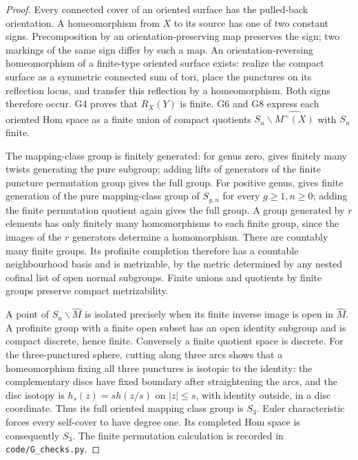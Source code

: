 \begin{proof}
Every connected cover of an oriented surface has the pulled-back
orientation. A homeomorphism from $X$ to its source has one of two
constant signs. Precomposition by an orientation-preserving map
preserves the sign; two markings of the same sign differ by such a
map. An orientation-reversing homeomorphism of a finite-type oriented
surface exists: realize the compact surface as a symmetric connected
sum of tori, place the punctures on its reflection locus, and transfer
this reflection by a homeomorphism. Both signs therefore occur.
G4 proves that $R_X(Y)$ is finite. G6 and G8 express each oriented
Hom space as a finite union of compact quotients
$S_u\backslash\widehat{M^+(X)}$ with $S_u$ finite.

The mapping-class group is finitely generated: for genus zero,
\cite[Theorem 4.9]{G_FarbMargalit} gives finitely many twists generating
the pure subgroup; adding lifts of generators of the finite puncture
permutation group gives the full group. For positive genus,
\cite[Theorem 4.11]{G_FarbMargalit} gives finite generation of the pure
mapping-class group of $S_{g,n}$ for every $g\geq1,n\geq0$; adding the
finite permutation quotient again gives the full group. A group generated by $r$
elements has only finitely many homomorphisms to each finite group,
since the images of the $r$ generators determine a homomorphism.
There are countably many finite groups. Its profinite completion
therefore has a countable neighbourhood basis and is metrizable,
by the metric determined by any nested cofinal list of open normal
subgroups. Finite unions and quotients by finite groups preserve
compact metrizability.

A point of $S_u\backslash\widehat M$ is isolated precisely when
its finite inverse image is open in $\widehat M$. A profinite group
with a finite open subset has an open identity subgroup and is compact
discrete, hence finite. Conversely a finite quotient space is discrete.
For the three-punctured sphere, cutting along three arcs shows that a
homeomorphism fixing all three punctures is isotopic to the identity:
the complementary discs have fixed boundary after straightening the
arcs, and the disc isotopy is $h_s(z)=s h(z/s)$ on $|z|\le s$, with
identity outside, in a disc coordinate. Thus its full oriented mapping
class group is $S_3$. Euler characteristic forces every self-cover to
have degree one. Its completed Hom space is consequently $S_3$.
The finite permutation calculation is recorded in \texttt{code/G\_checks.py}.
\end{proof}

